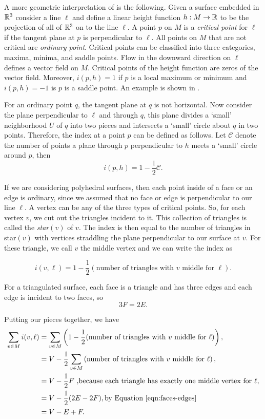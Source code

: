 A more geometric interpretation of  is the following.
Given a surface embedded in $\mathbb{R}^3$ consider a line $\ell$ and define a 
linear height function $h:M \to \mathbb{R}$
to be the projection of all of $\mathbb{R}^3$ on to the line $\ell$. A point $p$ on $M$
is a \emph{critical point} for $\ell$ if the tangent plane at $p$ is perpendicular to $\ell$.
All points on $M$ that are not critical are \emph{ordinary point}.
Critical points can be classified into three categories, maxima, minima, and saddle points.
Flow in the downward direction on $\ell$ defines a vector field on $M$.
Critical points of the height function are zeros of the vector field.
Moreover, $i(p,h)=1$ if $p$ is a  local maximum or minimum and $i(p,h)=-1$ is $p$ is a saddle point.
An example is shown in .


For an ordinary point $q$, the tangent plane at $q$ is not horizontal. 
Now consider the plane perpendicular to $\ell$ and through $q$, this plane
divides a `small' neighborhood $U$ of $q$ into two pieces and intersects
a `small' circle about $q$ in two points.
Therefore, the index at a point $p$ can be defined as follows.
Let $\mathcal{C}$ denote the number of points a plane through $p$ perpendicular
to $h$ meets a `small' circle around $p$, then 
$$i(p,h)=1-\frac{1}{2}\mathcal{C}.$$

If we are considering polyhedral surfaces, then each point inside of a face or an edge
is ordinary, since we assumed that no face or edge is perpendicular to our line $\ell.$
A vertex can be any of the three types of critical points.
So, for each vertex $v$, we cut out the triangles incident to it. This collection of triangles
is called the \emph{star}$(v)$ of $v$. 
The index is then equal to the number of triangles in star$(v)$ with vertices
straddling the plane perpendicular to our surface at $v$. For these triangle,
we call $v$ the middle vertex and we can write the index as

$$i(v,\ell)=1-\frac{1}{2} \left(\text{number of triangles with } v \text{ middle for } \ell\right).$$



For a triangulated surface, each face is a triangle and has three edges and each
edge is incident to two faces, so
\begin{equation} \label{eqn:faces-edges}
	3F=2E.
\end{equation}

Putting our pieces together, we have
\begin{align}
\sum_{v\in M}i(v,\ell) &=\sum_{v\in M} \left(1-\frac{1}{2}(\text{number of triangles with } v \text{ middle for } \ell)\right),  \\ \nonumber
       &=V - \frac{1}{2}\sum_{v\in M} \left(\text{number of triangles with } v \text{ middle for } \ell\right), \\ \nonumber
       &=V-\frac{1}{2} F \text{ ,because each triangle has exactly one middle vertex for  } \ell,\\ \nonumber
       &= V-\frac{1}{2}(2E-2F), \text{by \eqnref{faces-edges}}\\ \nonumber
       &=V-E+F. \nonumber 
\end{align}



